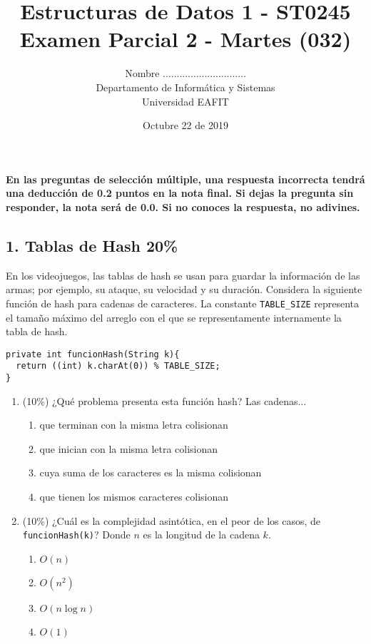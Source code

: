 \documentclass[10 pt]{article}
\title{\textbf {Estructuras de Datos 1 - ST0245\\Examen Parcial 2 - Martes (032)
}}
\author{Nombre ..............................\\
		Departamento de Informática y Sistemas\\
		Universidad EAFIT\\}
\date{Octubre 22 de 2019}
\begin{document}
\lstset{escapechar=@,style=customc, numbers=left, stepnumber = 1} 
\maketitle

\textbf{En las preguntas de selección múltiple, una respuesta incorrecta tendrá
una deducción de 0.2 puntos en la nota final. Si dejas la pregunta sin
responder, la nota será de 0.0. Si no conoces la respuesta, no adivines.}


\begin{multicols}{2}


\section{1. Tablas de Hash 20\%}
En los videojuegos, las tablas de hash se usan para guardar la información de las armas; por ejemplo,
su ataque, su velocidad y su duración. Considera la siguiente función de hash para cadenas de caracteres.
La constante \texttt{TABLE\_SIZE} representa el tamaño máximo del arreglo con el que se representamente
internamente la tabla de hash.

{\footnotesize
\begin{lstlisting}
private int funcionHash(String k){
  return ((int) k.charAt(0)) % TABLE_SIZE;
}
\end{lstlisting}
}
\begin{enumerate}[label=\alph*]
	\item (10\%) ¿Qué problema presenta esta función hash? Las cadenas...
	{\small
	\begin{enumerate}[label=\roman*]
		\item  que terminan con la misma letra colisionan
		\item  que inician con la misma letra colisionan
		\item  cuya suma de los caracteres es la misma colisionan
		\item  que tienen los mismos caracteres colisionan
	\end{enumerate}
	}
	\item (10\%) ¿Cuál es la complejidad asintótica, en el peor de los casos, de \texttt{funcionHash(k)}? Donde $n$ es la longitud de la cadena $k$.
	\begin{enumerate}[label=\roman*]
		\item $O(n)$
		\item $O(n^2)$
		\item $O(n\log n)$
		\item $O(1)$
	\end{enumerate}
\end{enumerate}




\end{multicols}
\end{document}
